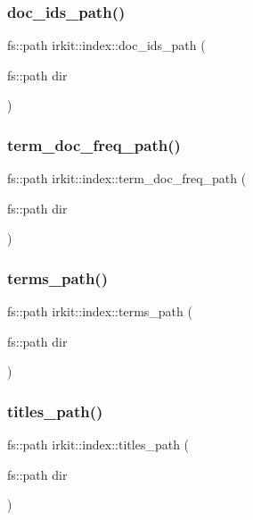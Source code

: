 \subsubsection{\texorpdfstring{doc\+\_\+ids\+\_\+path()}{doc\_ids\_path()}}
{\footnotesize\ttfamily fs\+::path irkit\+::index\+::doc\+\_\+ids\+\_\+path (\begin{DoxyParamCaption}\item[{fs\+::path}]{dir }\end{DoxyParamCaption})}

\mbox{\label{namespaceirkit_1_1index_a28db3dab0a7fd926c5a4e6a4d37755c3}} 
\subsubsection{\texorpdfstring{term\+\_\+doc\+\_\+freq\+\_\+path()}{term\_doc\_freq\_path()}}
{\footnotesize\ttfamily fs\+::path irkit\+::index\+::term\+\_\+doc\+\_\+freq\+\_\+path (\begin{DoxyParamCaption}\item[{fs\+::path}]{dir }\end{DoxyParamCaption})}

\mbox{\label{namespaceirkit_1_1index_ad05e7b96e9fec4cb7f93df6ea934c063}} 
\subsubsection{\texorpdfstring{terms\+\_\+path()}{terms\_path()}}
{\footnotesize\ttfamily fs\+::path irkit\+::index\+::terms\+\_\+path (\begin{DoxyParamCaption}\item[{fs\+::path}]{dir }\end{DoxyParamCaption})}

\mbox{\label{namespaceirkit_1_1index_a556d5fca1ddd33b4c09cd470ad7f9861}} 
\subsubsection{\texorpdfstring{titles\+\_\+path()}{titles\_path()}}
{\footnotesize\ttfamily fs\+::path irkit\+::index\+::titles\+\_\+path (\begin{DoxyParamCaption}\item[{fs\+::path}]{dir }\end{DoxyParamCaption})}

